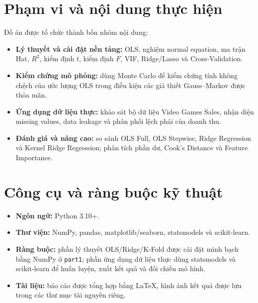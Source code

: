 \documentclass[12pt,a4paper]{article}
\begin{document}
\section{Phạm vi và nội dung thực hiện}
Đồ án được tổ chức thành bốn nhóm nội dung:
\begin{itemize}
    \item \textbf{Lý thuyết và cài đặt nền tảng:} OLS, nghiệm normal equation, ma trận Hat, $R^2$, kiểm định $t$, kiểm định $F$, VIF, Ridge/Lasso và Cross-Validation.
    \item \textbf{Kiểm chứng mô phỏng:} dùng Monte Carlo để kiểm chứng tính không chệch của ước lượng OLS trong điều kiện các giả thiết Gauss--Markov được thỏa mãn.
    \item \textbf{Ứng dụng dữ liệu thực:} khảo sát bộ dữ liệu Video Games Sales, nhận diện missing values, data leakage và phân phối lệch phải của doanh thu.
    \item \textbf{Đánh giá và nâng cao:} so sánh OLS Full, OLS Stepwise, Ridge Regression và Kernel Ridge Regression; phân tích phần dư, Cook's Distance và Feature Importance.
\end{itemize}

\section{Công cụ và ràng buộc kỹ thuật}
\begin{itemize}
    \item \textbf{Ngôn ngữ:} Python 3.10+.
    \item \textbf{Thư viện:} NumPy, pandas, matplotlib/seaborn, statsmodels và scikit-learn.
    \item \textbf{Ràng buộc:} phần lý thuyết OLS/Ridge/K-Fold được cài đặt minh bạch bằng NumPy ở \texttt{part1}; phần ứng dụng dữ liệu thực dùng statsmodels và scikit-learn để huấn luyện, xuất kết quả và đối chiếu mô hình.
    \item \textbf{Tài liệu:} báo cáo được tổng hợp bằng \LaTeX, hình ảnh kết quả được lưu trong các thư mục tài nguyên riêng.
\end{itemize}
\end{document}
